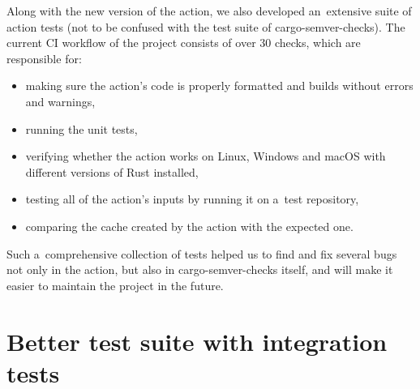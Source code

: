 \documentclass[licencjacka,en]{pracamgr}
\begin{document}
Along with the new version of the action, we also developed an~extensive suite of action tests
(not to be confused with the test suite of cargo-semver-checks). The current CI workflow
of the project consists of over 30 checks, which are responsible for:
\begin{itemize}
	\item making sure the action's code is properly formatted and builds without errors
		and warnings,
	\item running the unit tests,
	\item verifying whether the action works on Linux, Windows and macOS with different versions of
		Rust installed,
	\item testing all of the action's inputs by running it on a~test repository,
	\item comparing the cache created by the action with the expected one.
\end{itemize}
Such a~comprehensive collection of tests helped us to find and fix several bugs not only
in the action, but also in cargo-semver-checks itself, and will make it easier to maintain
the project in the future.

\section{Better test suite with integration tests}\label{r:section_test_suite}
\end{document}
